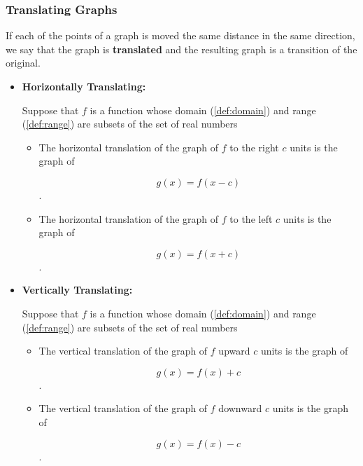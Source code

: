 \label{les_5_unit_1:transform_graph_from_a_function}

\subsubsection{Translating Graphs}
\label{sub_sub_sec:translating_graphs}

If each of the points of a graph is moved the same distance in the same
direction, we say that the graph is \textbf{translated} and the resulting
graph is a transition of the original.

\begin{itemize}
  \label{item:translating}

  \item \textbf{Horizontally Translating:}

    Suppose that $f$ is a function whose domain (\ref{def:domain}) and range
    (\ref{def:range}) are subsets of the set of real numbers

    \begin{itemize}
      \label{item:translating_horizontally}
    
      \item The horizontal translation of the graph of $f$ to the right $c$
        units is the graph of

        \[ g(x) = f(x - c) \].

      \item The horizontal translation of the graph of $f$ to the left $c$
        units is the graph of

        \[ g(x) = f(x + c) \].
    \end{itemize}

  \item \textbf{Vertically Translating:}

    Suppose that $f$ is a function whose domain (\ref{def:domain}) and range
    (\ref{def:range}) are subsets of the set of real numbers

    \begin{itemize}
      \label{item:translating_vertically}
    
      \item The vertical translation of the graph of $f$ upward $c$ units is
        the graph of

        \[ g(x) = f(x) + c \].

      \item The vertical translation of the graph of $f$ downward $c$ units is
        the graph of

        \[ g(x) = f(x) - c \].
    \end{itemize}
\end{itemize}

